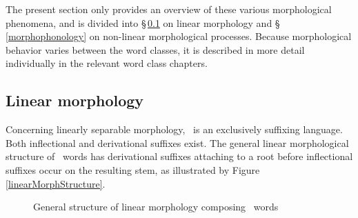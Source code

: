 The present section only provides an overview of these various morphological phenomena, and is divided into §\,\ref{linearMorphology} on linear morphology and §\,\ref{morphophonology} on non-linear morphological processes. %
Because morphological behavior varies between the word classes, it is described in more detail individually in the relevant word class chapters.  


\subsection{Linear morphology}\label{linearMorphology}
Concerning linearly separable morphology, \PS\ is an exclusively suffixing language. Both inflectional and derivational suffixes exist. %
The general linear morphological structure of \PS\ words has derivational suffixes attaching to a root before inflectional suffixes occur on the resulting stem, as illustrated by %
Figure \vref{linearMorphStructure}.
\begin{figure}
\caption{General structure of linear morphology composing \PS\ words}\label{linearMorphStructure}
\end{figure}

%



